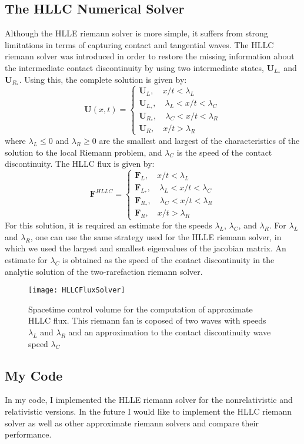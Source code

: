 \subsection{The HLLC Numerical Solver }
Although the HLLE riemann solver is more simple, it suffers from strong limitations in terms of capturing contact and tangential waves. The HLLC riemann solver was introduced in order to restore the missing information about the intermediate contact discontinuity by using two intermediate states, $\bm{U}_{L_*}$ and $\bm{U}_{R_*}$. Using this, the complete solution is given by:
$$\bm{U}(x,t)=\begin{cases}
		\bm{U}_L, \quad x/t < \lambda_L\\
		\bm{U}_{L_*}, \quad \lambda_L < x/t < \lambda_C\\
		\bm{U}_{R_*},\quad \lambda_C < x/t < \lambda_R\\
		\bm{U}_R,\quad x/t > \lambda_R
\end{cases}$$
where $\lambda_L \leq 0 $ and $\lambda_R \geq 0$ are the smallest and largest of the characteristics of the solution to the local Riemann problem, and $\lambda_C$ is the speed of the contact discontinuity. The HLLC flux is given by:
$$\bm{F}^{HLLC}=\begin{cases}
		\bm{F}_L,\quad x/t < \lambda_L\\
		\bm{F}_{L_*},\quad \lambda_L < x/t < \lambda_C\\
		\bm{F}_{R_*},\quad \lambda_C < x/t < \lambda_R \\
		\bm{F}_R,\quad x/t > \lambda_R
\end{cases}$$
For this solution, it is required an estimate for the speeds $\lambda_L$, $\lambda_C$, and $\lambda_R$. For $\lambda_L$ and $\lambda_R$, one can use the same strategy used for the HLLE riemann solver, in which we used the largest and smallest eigenvalues of the jacobian matrix. An estimate for $\lambda_C$ is obtained as the speed of the contact discontinuity in the analytic solution of the two-rarefaction riemann solver. 
\begin{figure}[h]
		\centering
		\texttt{[image: HLLCFluxSolver]}
		\caption{Spacetime control volume for the computation of approximate HLLC flux. This riemann fan is coposed of two waves with speeds $\lambda_L$ and $\lambda_R$ and an approximation to the contact discontinuity wave speed $\lambda_C$}
\end{figure}

\subsection{My Code}
In my code, I implemented the HLLE riemann solver for the nonrelativistic and relativistic versions. In the future I would like to implement the HLLC riemann solver as well as other approximate riemann solvers and compare their performance. 
